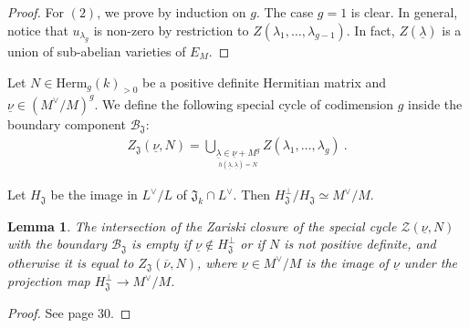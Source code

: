 \documentclass[11pt,letterpaper,english]{amsart}
\numberwithin{equation}{subsection}
\numberwithin{equation}{section}
\newcommand\cB{{\mathcal B}}
\newcommand\cD{{\mathcal D}}
\newcommand\cJ{{\mathcal J}}
\newcommand\cZ{{\mathcal Z}}
\newcommand\fJ{{\mathfrak J}}
\theoremstyle{plain}
\newtheorem{lemma}[theorem]{Lemma}
\newtheorem{corollary}[theorem]{Corollary}
\theoremstyle{remark}
\begin{document}
\begin{proof}
For $(2)$, we prove by induction on $g$. The case $g=1$ is clear. In general, notice that $u_{\lambda_g}$ is non-zero by restriction to $Z(\lambda_1,\ldots,\lambda_{g-1})$. In fact, $Z(\underline \lambda)$ is a union of sub-abelian varieties of $E_M$.
\end{proof}


Let $N\in \mathrm{Herm}_{g}(k)_{>0}$ be a positive definite Hermitian matrix and $\underline{\nu}\in (M^{\vee}/M)^g$. We define the following special cycle of codimension $g$ inside the boundary component $\cB_{\mathfrak J}$: 
\begin{align}\label{equ:boundary-divisor} Z_{\mathfrak J}(\underline{\nu},N)=\bigcup_{\underset{h(\underline \lambda,\underline \lambda)=N}{\underline{\lambda}\in \underline{\nu}+M^g}}Z(\lambda_1,\ldots,\lambda_g)~.
\end{align}


Let $H_\fJ$ be the image in $L^\vee/L$ of $\fJ_k\cap L^\vee$. Then $H_\fJ^\bot/H_\fJ \simeq M^\vee/M$. %
\begin{lemma}\label{l:limit-of-cycles}
   The intersection of the Zariski closure of the special cycle $\cZ(\underline{\nu},N)$ with the boundary $\cB_\fJ$ is empty if $\underline{\nu}\notin H_\fJ^\bot$ or if $N$ is not positive definite, and otherwise it is equal to
   $Z_{\mathfrak J}(\overline\nu,N)$,
   where $\underline \nu\in M^\vee/M$ is the image of $\underline\nu$ under the projection map $H_\fJ^\bot\rightarrow M^\vee/M$.
\end{lemma}
\begin{proof}
See \cite{howard-CMII}  page 30. 




\end{proof}

\end{document}
